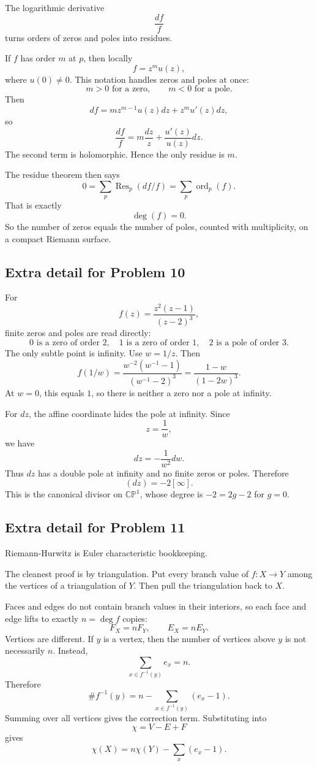 \documentclass[11pt]{article}
\newcommand{\CP}{\mathbb{CP}}
\newcommand{\ord}{\operatorname{ord}}
\newcommand{\Res}{\operatorname{Res}}
\begin{document}
The logarithmic derivative
\[
 \frac{df}{f}
\]
turns orders of zeros and poles into residues.

If $f$ has order $m$ at $p$, then locally
\[
 f=z^m u(z),
\]
where $u(0)\neq0$. This notation handles zeros and poles at once:
\[
 m>0 \text{ for a zero},\qquad m<0 \text{ for a pole}.
\]
Then
\[
 df=mz^{m-1}u(z)dz+z^m u'(z)dz,
\]
so
\[
 \frac{df}{f}
 =
 m\frac{dz}{z}+\frac{u'(z)}{u(z)}dz.
\]
The second term is holomorphic. Hence the only residue is $m$.

The residue theorem then says
\[
 0=\sum_p\Res_p(df/f)=\sum_p\ord_p(f).
\]
That is exactly
\[
 \deg(f)=0.
\]
So the number of zeros equals the number of poles, counted with multiplicity, on a compact Riemann surface.

\subsection*{Extra detail for Problem 10}

For
\[
 f(z)=\frac{z^2(z-1)}{(z-2)^3},
\]
finite zeros and poles are read directly:
\[
 0\text{ is a zero of order }2,\quad
 1\text{ is a zero of order }1,\quad
 2\text{ is a pole of order }3.
\]
The only subtle point is infinity. Use $w=1/z$. Then
\[
 f(1/w)=\frac{w^{-2}(w^{-1}-1)}{(w^{-1}-2)^3}
 =
 \frac{1-w}{(1-2w)^3}.
\]
At $w=0$, this equals $1$, so there is neither a zero nor a pole at infinity.

For $dz$, the affine coordinate hides the pole at infinity. Since
\[
 z=\frac1w,
\]
we have
\[
 dz=-\frac{1}{w^2}dw.
\]
Thus $dz$ has a double pole at infinity and no finite zeros or poles. Therefore
\[
 (dz)=-2[\infty].
\]
This is the canonical divisor on $\CP^1$, whose degree is $-2=2g-2$ for $g=0$.

\subsection*{Extra detail for Problem 11}

Riemann-Hurwitz is Euler characteristic bookkeeping.

The cleanest proof is by triangulation. Put every branch value of $f:X\to Y$ among the vertices of a triangulation of $Y$. Then pull the triangulation back to $X$.

Faces and edges do not contain branch values in their interiors, so each face and edge lifts to exactly $n=\deg f$ copies:
\[
 F_X=nF_Y,\qquad E_X=nE_Y.
\]
Vertices are different. If $y$ is a vertex, then the number of vertices above $y$ is not necessarily $n$. Instead,
\[
 \sum_{x\in f^{-1}(y)}e_x=n.
\]
Therefore
\[
 \#f^{-1}(y)=n-\sum_{x\in f^{-1}(y)}(e_x-1).
\]
Summing over all vertices gives the correction term. Substituting into
\[
 \chi=V-E+F
\]
gives
\[
 \chi(X)=n\chi(Y)-\sum_x(e_x-1).
\]
\end{document}
